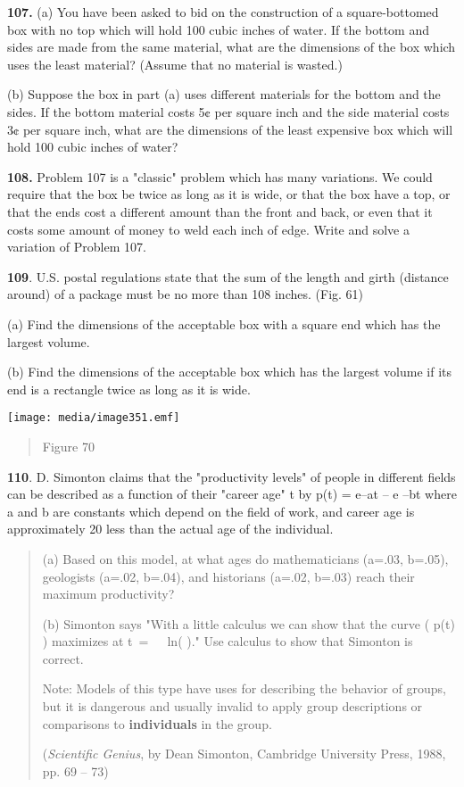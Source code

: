 \textbf{107.} (a) You have been asked to bid on the construction of a
square-bottomed box with no top which will hold 100 cubic inches of
water. If the bottom and sides are made from the same material, what are
the dimensions of the box which uses the least material? (Assume that no
material is wasted.)

(b) Suppose the box in part (a) uses different materials for the bottom
and the sides. If the bottom material costs 5¢ per square inch and the
side material costs 3¢ per square inch, what are the dimensions of the
least expensive box which will hold 100 cubic inches of water?

\textbf{108.} Problem 107 is a "classic" problem which has many
variations. We could require that the box be twice as long as it is
wide, or that the box have a top, or that the ends cost a different
amount than the front and back, or even that it costs some amount of
money to weld each inch of edge. Write and solve a variation of Problem
107.

\textbf{109}. U.S. postal regulations state that the sum of the length
and girth (distance around) of a package must be no more than 108
inches. (Fig. 61)

(a) Find the dimensions of the acceptable box with a square end which
has the largest volume.

(b) Find the dimensions of the acceptable box which has the largest
volume if its end is a rectangle twice as long as it is wide.

\texttt{[image: media/image351.emf]}

\begin{quote}
Figure 70
\end{quote}

\textbf{110}. D. Simonton claims that the "productivity levels" of
people in different fields can be described as a function of their
"career age" t by p(t) = e--at -- e --bt where a and b are constants
which depend on the field of work, and career age is approximately 20
less than the actual age of the individual.

\begin{quote}
(a) Based on this model, at what ages do mathematicians (a=.03, b=.05),
geologists (a=.02, b=.04), and historians (a=.02, b=.03) reach their
maximum productivity?

(b) Simonton says "With a little calculus we can show that the curve (
p(t) ) maximizes at t~=~~~ln( )." Use calculus to show that Simonton is
correct.

Note: Models of this type have uses for describing the behavior of
groups, but it is dangerous and usually invalid to apply group
descriptions or comparisons to \textbf{individuals} in the group.

(\emph{Scientific Genius}, by Dean Simonton, Cambridge University Press,
1988, pp. 69 -- 73)
\end{quote}

